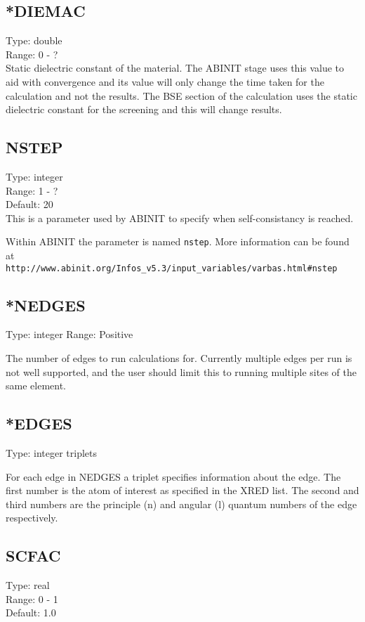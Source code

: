\documentclass[12pt]{article}
\begin{document}
\subsection{*DIEMAC}
Type: double \\
Range: 0 - ? \\

Static dielectric constant of the material. The \textsc{ABINIT} stage uses this value to aid with convergence and its value will only change the time taken for the calculation and not the results. The BSE section of 
the calculation uses the static dielectric constant for the screening and this will change results.

\subsection{NSTEP}
Type: integer \\
Range: 1 - ? \\
Default: 20  \\

This is a parameter used by \textsc{ABINIT} to specify when 
self-consistancy is reached. 

Within \textsc{ABINIT} the parameter is named \verb|nstep|.
More information can be found at 
\\ 
\verb|http://www.abinit.org/Infos_v5.3/input_variables/varbas.html#nstep|

\subsection{*NEDGES}
Type: integer
Range: Positive

The number of edges to run calculations for. Currently multiple edges per run is not well supported, and 
the user should limit this to running multiple sites of the same element.

\subsection{*EDGES}
Type: integer triplets

For each edge in NEDGES a triplet specifies information about the edge. The first number is the atom of
 interest as specified in the XRED list. The second and third numbers are the principle (n) and angular (l)
quantum numbers of the edge respectively. 

\subsection{SCFAC}
Type: real \\
Range: 0 - 1 \\
Default: 1.0 \\
\end{document}
